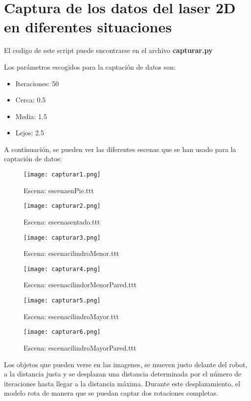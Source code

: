 \newpage

\section{Captura de los datos del laser 2D en diferentes situaciones}

El codigo de este script puede encontrarse en el archivo \textbf{capturar.py}

Los parámetros escogidos para la captación de datos son:
\begin{itemize}
	\item Iteraciones: 50
	\item Cerca: 0.5
	\item Media: 1.5
	\item Lejos: 2.5
\end{itemize}

A continuación, se pueden ver las diferentes escenas que se han usado para la captación de datos:

\begin{figure}[H]
	\centering
	\texttt{[image: capturar1.png]}
	\caption{Escena: escenaenPie.ttt}
\end{figure}
\begin{figure}[H]
	\centering
	\texttt{[image: capturar2.png]}
	\caption{Escena: escenasentado.ttt}
\end{figure}
\begin{figure}[H]
	\centering
	\texttt{[image: capturar3.png]}
	\caption{Escena: escenacilindroMenor.ttt}
\end{figure}
\begin{figure}[H]
	\centering
	\texttt{[image: capturar4.png]}
	\caption{Escena: escenacilindorMenorPared.ttt}
\end{figure}
\begin{figure}[H]
	\centering
	\texttt{[image: capturar5.png]}
	\caption{Escena: escenacilindroMayor.ttt}
\end{figure}
\begin{figure}[H]
	\centering
	\texttt{[image: capturar6.png]}
	\caption{Escena: escenacilindroMayorPared.ttt}
\end{figure}

Los objetos que pueden verse en las imagenes, se mueven justo delante del robot, a la distancia justa y se desplazan una distancia determinada por el número de iteraciones hasta llegar a la distancia máxima. Durante este desplazamiento, el modelo rota de manera que se puedan captar dos rotaciones completas.

